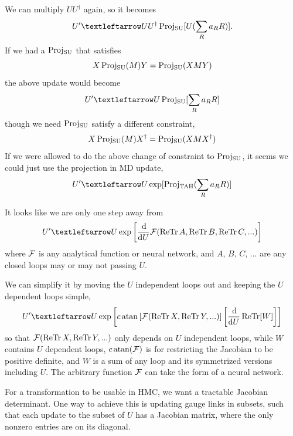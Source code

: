 We can multiply $U U^\dag$ again, so it becomes
\begin{equation}
	U' ← U { U^\dag \ProjSU[ U (\sum_R a_R R) ] }.
\end{equation}
If we had a $\operatorname{Proj_{\text{SU}}}$ that satisfies
\begin{equation}
	X \operatorname{Proj_{\text{SU}}}(M) Y = \operatorname{Proj_{\text{SU}}}(X M Y)
\end{equation}
the above update would become
\begin{equation}
	U' ← U \ProjSU[ \sum_R a_R R ]
\end{equation}
though we need $\operatorname{Proj_{\text{SU}}}$ satisfy a different constraint,
\begin{equation}
	X \operatorname{Proj_{\text{SU}}}(M) X^\dag = \operatorname{Proj_{\text{SU}}}(X M X^\dag)
\end{equation}
If we were allowed to do the above change of constraint to $\operatorname{Proj_{\text{SU}}}$, it seems we could just use the projection in MD update,
\begin{equation}
	U' ← U \exp[ \ProjTAH( \sum_R a_R R ) ]
\end{equation}

It looks like we are only one step away from
\begin{equation}
	U' ← U \exp\left[ \frac{\dd}{\dd U} \F( \ReTr A, \ReTr B, \ReTr C, ... ) \right]
\end{equation}
where $\mathcal{F}$ is any analytical function or neural network, and $A$, $B$, $C$, ... are any closed
loops may or may not passing $U$.

We can simplify it by moving the $U$ independent loops out and keeping
the $U$ dependent loops simple,
\begin{equation}
\label{eq:gen-smear}
	U' ← U \exp\left[ c \atan\left[\F(\ReTr X, \ReTr Y, ...)\right] \left[\frac{\dd}{\dd U} \ReTr[W]\right] \right]
\end{equation}
so that $\mathcal{F}(\operatorname{ReTr} X, \operatorname{ReTr} Y, ...)$ only depends on $U$ independent loops,
while $W$ contains $U$ dependent loops, $c \operatorname{atan}(\mathcal{F})$ is for restricting
the Jacobian to be positive definite, and $W$ is a sum of any loop
and its symmetrized versions including $U$.
The arbitrary function $\mathcal{F}$ can take the form of a neural network.

For a transformation to be usable in HMC, we want a tractable Jacobian determinant.
One way to achieve this is updating gauge links in subsets,
such that each update to the subset of $U$ has a Jacobian matrix,
where the only nonzero entries are on its diagonal.

